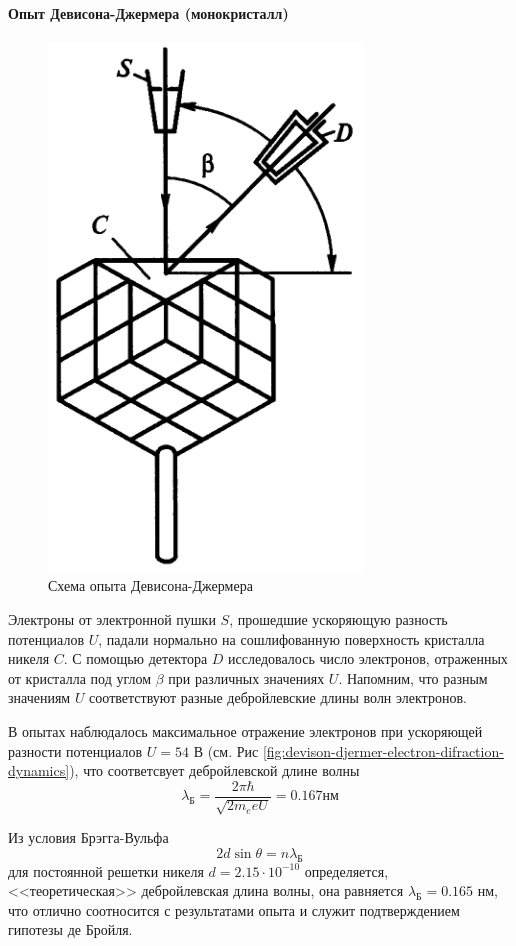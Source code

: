 \paragraph{Опыт Девисона-Джермера (монокристалл)}
\begin{figure}
	\centering
	\includegraphics[width=0.5\linewidth]{img/oral-05/devison-djermer}
	\caption{Схема опыта Девисона-Джермера}
	\label{fig:devison-djermer}
\end{figure}
Электроны от электронной пушки $S$, прошедшие ускоряющую разность потенциалов $U$, падали нормально на сошлифованную поверхность кристалла никеля $C$. С помощью детектора $D$ исследовалось число электронов, отраженных от кристалла под углом $\beta$ при различных значениях $U$. Напомним, что разным значениям $U$ соответствуют разные дебройлевские длины волн электронов.

В опытах наблюдалось максимальное отражение электронов при ускоряющей разности потенциалов $U=54$ В (см. Рис \ref{fig:devison-djermer-electron-difraction-dynamics}), что соответсвует дебройлевской длине волны
\begin{equation*}
	\lambda_{\text{Б}}=\frac{2\pi\hbar}{\sqrt{2m_eeU}}=0.167 \text{нм}
\end{equation*}

Из условия Брэгга-Вульфа 
\begin{equation*}
	2d\sin\theta=n\lambda_{\text{Б}}
\end{equation*}
для постоянной решетки никеля $d=2.15\cdot10^{-10}$ определяется, <<теоретическая>> дебройлевская длина волны, она равняется $\lambda_{\text{Б}}=0.165$ нм, что отлично соотносится с результатами опыта и служит подтверждением гипотезы де Бройля.

